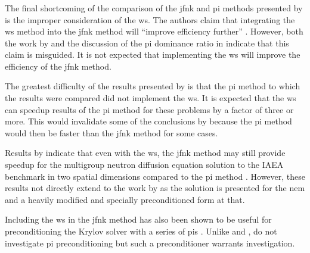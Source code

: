     \subsubsection{}
    \label{sec:wielandt_shift}

      The final shortcoming of the comparison of the \gls{jfnk} and \gls{pi}
      methods presented by \citeauthor{qe2paper} is the improper consideration
      of the \gls{ws}. The authors claim that integrating the \gls{ws} method
      into the \gls{jfnk} method will ``improve efficiency further''
      \cite{qe2paper}. However, both the work by \citeauthor{gill_azmy} and the
      discussion of the \gls{pi} dominance ratio in 
      indicate that this claim is misguided. It is not expected that
      implementing the \gls{ws} will improve the efficiency of the \gls{jfnk}
      method.

      The greatest difficulty of the results presented by \citeauthor{qe2paper}
      is that the \gls{pi} method to which the results were compared did not
      implement the \gls{ws}. It is expected that the \gls{ws} can speedup
      results of the \gls{pi} method for these problems by a factor of three or
      more. This would invalidate some of the conclusions by
      \citeauthor{qe2paper} because the \gls{pi} method would then be faster
      than the \gls{jfnk} method for some cases.

      Results by \citeauthor{jfnk_wielandt} indicate that even with the
      \gls{ws}, the \gls{jfnk} method may still provide speedup for the
      multigroup neutron diffusion equation solution to the IAEA benchmark in
      two spatial dimensions compared to the \gls{pi} method
      \cite{jfnk_wielandt}. However, these results not directly extend to the
      work by \citeauthor{qe2paper} as the solution is presented for the
      \gls{nem} and a heavily modified and specially preconditioned form at
      that.

      Including the \gls{ws} in the \gls{jfnk} method has also been shown to be
      useful for preconditioning the Krylov solver with a series of \glspl{pi}
      \cite{jfnk_wielandt}. Unlike \citeauthor{gill_azmy} and
      \citeauthor{jfnk_wielandt}, \citeauthor{qe2paper} do not investigate
      \gls{pi} preconditioning but such a preconditioner warrants investigation.
